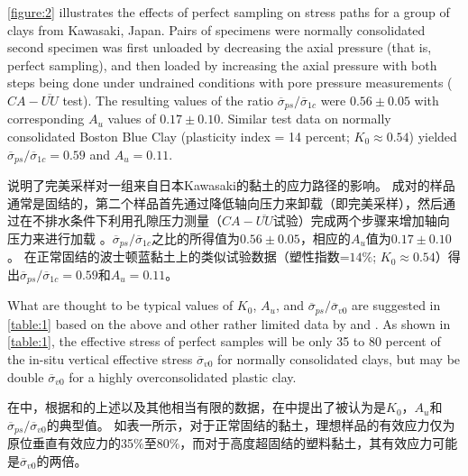 

\begin{paracol}{2}
    
    \autoref{figure:2} illustrates the effects of perfect sampling on stress paths for a group of clays from Kawasaki, Japan. Pairs of specimens were normally consolidated second specimen was first unloaded by decreasing the axial pressure (that is, perfect sampling), and then loaded by increasing the axial pressure with both steps being done under undrained conditions with pore pressure measurements ($CA-\overline{UU}$ test). The resulting values of the ratio $\overline{\sigma}_{ps}/\overline{\sigma}_{1c}$ were $0.56\pm{}0.05$ with corresponding $A_u$ values of $0.17\pm{}0.10$. Similar test data on normally consolidated Boston Blue Clay (plasticity index = 14 percent; $K_0\approx{}0.54$) yielded $\overline{\sigma}_{ps}/\overline{\sigma}_{1c}=0.59$ and $A_u= 0.11$.

    \switchcolumn

    说明了完美采样对一组来自日本Kawasaki的黏土的应力路径的影响。 成对的样品通常是固结的，第二个样品首先通过降低轴向压力来卸载（即完美采样），然后通过在不排水条件下利用孔隙压力测量（$CA-\overline{UU}$试验）完成两个步骤来增加轴向压力来进行加载 。$\overline{\sigma}_{ps}/\overline{\sigma}_{1c}$之比的所得值为$0.56\pm{}0.05$，相应的$A_u$值为$0.17\pm{}0.10$。 在正常固结的波士顿蓝黏土上的类似试验数据（塑性指数=$14\%$; $K_0\approx{}0.54$）得出$\overline{\sigma}_{ps}/\overline{\sigma}_{1c}=0.59$和$A_u= 0.11$。

\end{paracol}



\begin{paracol}{2}
    
    What are thought to be typical values of $K_0$, $A_u$, and $\overline{\sigma}_{ps}/\overline{\sigma}_{v0}$ are suggested in \autoref{table:1} based on the above and other rather limited data by \citet{Bishop195394} and \citet{Skempton1961351}. As shown in \autoref{table:1}, the effective stress of perfect samples will be only 35 to 80 percent of the in-situ vertical effective stress $\overline{\sigma}_{v0}$ for normally consolidated clays, but may be double $\overline{\sigma}_{v0}$ for a highly overconsolidated plastic clay.

    \switchcolumn

    在中，根据\citet{Bishop195394}和\citet{Skempton1961351}的上述以及其他相当有限的数据，在中提出了被认为是$K_0$，$A_u$和$\overline{\sigma}_{ps}/\overline{\sigma}_{v0}$的典型值。 如表一所示，对于正常固结的黏土，理想样品的有效应力仅为原位垂直有效应力的35$\%$至80$\%$，而对于高度超固结的塑料黏土，其有效应力可能是$\overline{\sigma}_{v0}$的两倍。

\end{paracol}

